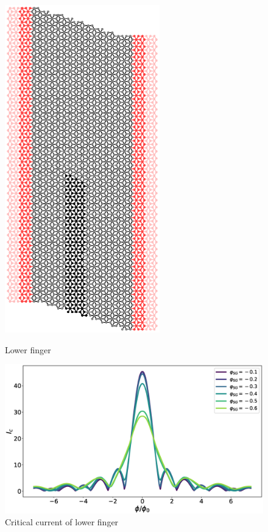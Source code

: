 \documentclass[a4paper]{article}
\begin{document}
\begin{figure}
\centering
\begin{minipage}{0.3\textwidth}
\centering
\includegraphics[width=0.6\textwidth]{hb_lower}
\caption{Lower finger}
\end{minipage}%
\begin{minipage}{0.7\textwidth}
\centering
\includegraphics[width=\textwidth]{hb_lower_plot}
\caption{Critical current of lower finger}
\end{minipage}
\end{figure}
\end{document}
